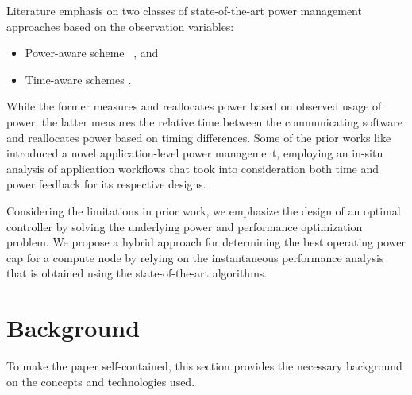 

Literature emphasis on two classes of state-of-the-art power management approaches based on the observation variables:
\begin{itemize}
\item Power-aware scheme ~\cite{hsu2005power,patki2015practical}, and
\item Time-aware schemes \cite{sadrosadati2019itap,qiu2012three}.
\end{itemize}
While the former measures and reallocates power based on observed usage of power, the latter measures the relative time between the communicating software and reallocates power based on timing differences. Some of the prior works like \cite{9139791,tsujita2022classifying} introduced a novel application-level power management, employing an in-situ analysis of application workflows that took into consideration both time and power feedback for its respective designs. 
\fi 

Considering the limitations in prior work, we emphasize the design of an optimal controller by solving the underlying power and performance optimization problem.  We propose a hybrid approach for determining the best operating power cap for a compute node by relying on the instantaneous performance analysis that is obtained using the state-of-the-art algorithms.

\section{Background}\label{sec:Background}
To make the paper self-contained, this section provides the necessary background on the concepts and technologies used.

